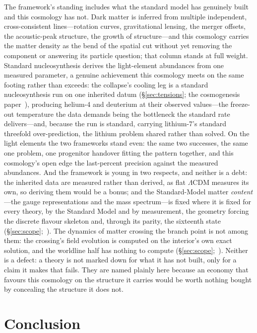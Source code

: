\documentclass[11pt,a4paper]{article}
\theoremstyle{plain}
\theoremstyle{definition}
\theoremstyle{remark}
\begin{document}
The framework's standing includes what the standard model has genuinely built and this cosmology has not. Dark matter is inferred from multiple independent, cross-consistent lines---rotation curves, gravitational lensing, the merger offsets, the acoustic-peak structure, the growth of structure---and this cosmology carries the matter density as the bend of the spatial cut without yet removing the component or answering its particle question; that column stands at full weight. Standard nucleosynthesis derives the light-element abundances from one measured parameter, a genuine achievement this cosmology meets on the same footing rather than exceeds: the collapse's cooling leg is a standard nucleosynthesis run on one inherited datum (\S\ref{sec:tensions}; the cosmogenesis paper~\cite{JanzenCosmogenesis}), producing helium-4 and deuterium at their observed values---the freeze-out temperature the data demands being the bottleneck the standard rate delivers---and, because the run is standard, carrying lithium-7's standard threefold over-prediction, the lithium problem shared rather than solved. On the light elements the two frameworks stand even: the same two successes, the same one problem, one progenitor handover fitting the pattern together, and this cosmology's open edge the last-percent precision against the measured abundances. And the framework is young in two respects, and neither is a debt: the inherited data are measured rather than derived, as flat $\Lambda$CDM measures its own, so deriving them would be a bonus; and the Standard-Model matter \emph{content}---the gauge representations and the mass spectrum---is fixed where it is fixed for every theory, by the Standard Model and by measurement, the geometry forcing the discrete flavour skeleton and, through its parity, the sixteenth state~\cite{JanzenMatter} (\S\ref{sec:scope};~\cite{JanzenCRframework}). The dynamics of matter crossing the branch point is not among them: the crossing's field evolution is computed on the interior's own exact solution, and the worldline half has nothing to compute (\S\ref{sec:scope};~\cite{JanzenCosmogenesis}). Neither is a defect: a theory is not marked down for what it has not built, only for a claim it makes that fails. They are named plainly here because an economy that favours this cosmology on the structure it carries would be worth nothing bought by concealing the structure it does not.

\section{Conclusion}\label{sec:conclusion}
\end{document}
